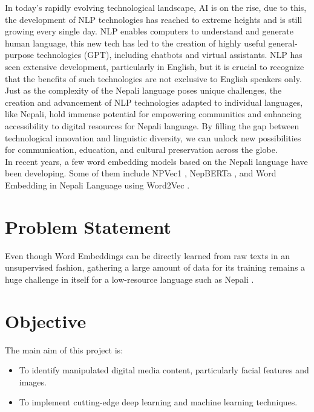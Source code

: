         In today's rapidly evolving technological landscape, AI is on the rise, due to this, the development of NLP technologies has reached to extreme heights and is still growing every single day. NLP enables computers to understand and generate human language, this new tech has led to the creation of highly useful general-purpose technologies (GPT), including chatbots and virtual assistants. NLP has seen extensive development, particularly in English, but it is crucial to recognize that the benefits of such technologies are not exclusive to English speakers only. Just as the complexity of the Nepali language poses unique challenges, the creation and advancement of NLP technologies adapted to individual languages, like Nepali, hold immense potential for empowering communities and enhancing accessibility to digital resources for Nepali language. By filling the gap between technological innovation and linguistic diversity, we can unlock new possibilities for communication, education, and cultural preservation across the globe. \\
        In recent years, a few word embedding models based on the Nepali language have been developing. Some of them include NPVec1 \cite{koirala-niraula-2021-npvec1}, NepBERTa \cite{timilsina-etal-2022-nepberta}, and Word Embedding in Nepali Language using Word2Vec \cite{inproceedings}. 

        \section{Problem Statement} 
        Even though Word Embeddings can be directly learned from raw texts in an unsupervised fashion, gathering a large amount of data for its training remains a huge challenge in itself for a low-resource language such as Nepali \cite{koirala-niraula-2021-npvec1}.
        \section{Objective}
            The main aim of this project is:
            \begin{itemize}
                \item To identify manipulated digital media content, particularly facial features and images.
                \item To implement cutting-edge deep learning and machine learning techniques.
            \end{itemize}

